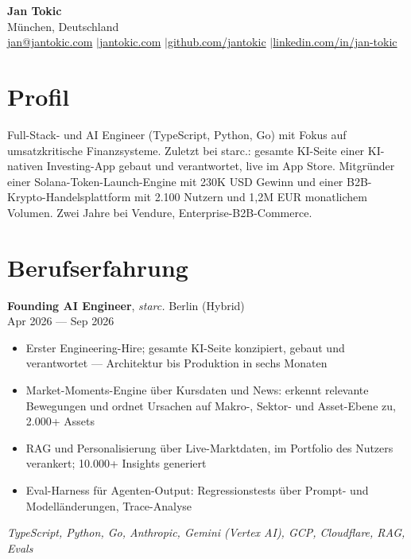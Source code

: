 \documentclass[a4paper,10pt]{article}
\newcommand{\entry}[4]{%
  \textbf{#1}, \textit{#2} \hfill #3 \\ \vspace{-2pt}
  {\small #4}%
}
\begin{document}
\begin{center}
  {\LARGE\bfseries Jan Tokic} \\[2pt]
  M\"unchen, Deutschland \\[1pt]
  \href{mailto:jan@jantokic.com}{jan@jantokic.com} \enspace$\vert$\enspace \href{https://jantokic.com}{jantokic.com} \enspace$\vert$\enspace \href{https://github.com/jantokic}{github.com/jantokic} \enspace$\vert$\enspace \href{https://linkedin.com/in/jan-tokic}{linkedin.com/in/jan-tokic}
\end{center}

\vspace{-4pt}

\section{Profil}
Full-Stack- und AI Engineer (TypeScript, Python, Go) mit Fokus auf umsatzkritische Finanzsysteme. Zuletzt bei starc.: gesamte KI-Seite einer KI-nativen Investing-App gebaut und verantwortet, live im App Store. Mitgr\"under einer Solana-Token-Launch-Engine mit 230K USD Gewinn und einer B2B-Krypto-Handelsplattform mit 2.100 Nutzern und 1,2M EUR monatlichem Volumen. Zwei Jahre bei Vendure, Enterprise-B2B-Commerce.

\section{Berufserfahrung}

\entry{Founding AI Engineer}{starc.}{Berlin (Hybrid)}{Apr 2026 --- Sep 2026}
\begin{itemize}
  \item Erster Engineering-Hire; gesamte KI-Seite konzipiert, gebaut und verantwortet --- Architektur bis Produktion in sechs Monaten
  \item Market-Moments-Engine \"uber Kursdaten und News: erkennt relevante Bewegungen und ordnet Ursachen auf Makro-, Sektor- und Asset-Ebene zu, 2.000+ Assets
  \item RAG und Personalisierung \"uber Live-Marktdaten, im Portfolio des Nutzers verankert; 10.000+ Insights generiert
  \item Eval-Harness f\"ur Agenten-Output: Regressionstests \"uber Prompt- und Modell\"anderungen, Trace-Analyse
\end{itemize}
{\small\textit{TypeScript, Python, Go, Anthropic, Gemini (Vertex AI), GCP, Cloudflare, RAG, Evals}}
\end{document}
